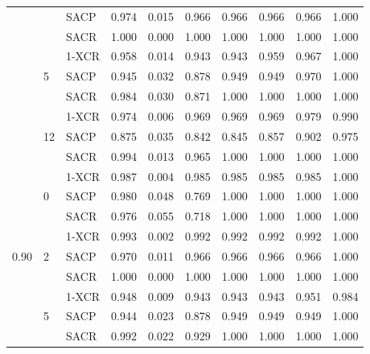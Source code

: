 \begin{longtable}[c]{@{}llllllllll@{}}
                        &                     & SACP   & 0.974 & 0.015 & 0.966 & 0.966 & 0.966 & 0.966 & 1.000 \\
                        &                     & SACR   & 1.000 & 0.000 & 1.000 & 1.000 & 1.000 & 1.000 & 1.000 \\* \cmidrule(l){3-10} 
                        & \multirow{3}{*}{5}  & 1-XCR  & 0.958 & 0.014 & 0.943 & 0.943 & 0.959 & 0.967 & 1.000 \\
                        &                     & SACP   & 0.945 & 0.032 & 0.878 & 0.949 & 0.949 & 0.970 & 1.000 \\
                        &                     & SACR   & 0.984 & 0.030 & 0.871 & 1.000 & 1.000 & 1.000 & 1.000 \\* \cmidrule(l){3-10} 
                        & \multirow{3}{*}{12} & 1-XCR  & 0.974 & 0.006 & 0.969 & 0.969 & 0.969 & 0.979 & 0.990 \\
                        &                     & SACP   & 0.875 & 0.035 & 0.842 & 0.845 & 0.857 & 0.902 & 0.975 \\
                        &                     & SACR   & 0.994 & 0.013 & 0.965 & 1.000 & 1.000 & 1.000 & 1.000 \\* \cmidrule(l){2-10} 
\multirow{12}{*}{0.90} & \multirow{3}{*}{0}  & 1-XCR  & 0.987 & 0.004 & 0.985 & 0.985 & 0.985 & 0.985 & 1.000 \\
                        &                     & SACP   & 0.980 & 0.048 & 0.769 & 1.000 & 1.000 & 1.000 & 1.000 \\
                        &                     & SACR   & 0.976 & 0.055 & 0.718 & 1.000 & 1.000 & 1.000 & 1.000 \\* \cmidrule(l){3-10} 
                        & \multirow{3}{*}{2}  & 1-XCR  & 0.993 & 0.002 & 0.992 & 0.992 & 0.992 & 0.992 & 1.000 \\
                        &                     & SACP   & 0.970 & 0.011 & 0.966 & 0.966 & 0.966 & 0.966 & 1.000 \\
                        &                     & SACR   & 1.000 & 0.000 & 1.000 & 1.000 & 1.000 & 1.000 & 1.000 \\* \cmidrule(l){3-10} 
                        & \multirow{3}{*}{5}  & 1-XCR  & 0.948 & 0.009 & 0.943 & 0.943 & 0.943 & 0.951 & 0.984 \\
                        &                     & SACP   & 0.944 & 0.023 & 0.878 & 0.949 & 0.949 & 0.949 & 1.000 \\
                        &                     & SACR   & 0.992 & 0.022 & 0.929 & 1.000 & 1.000 & 1.000 & 1.000 \\* \cmidrule(l){3-10} 

\end{longtable}
